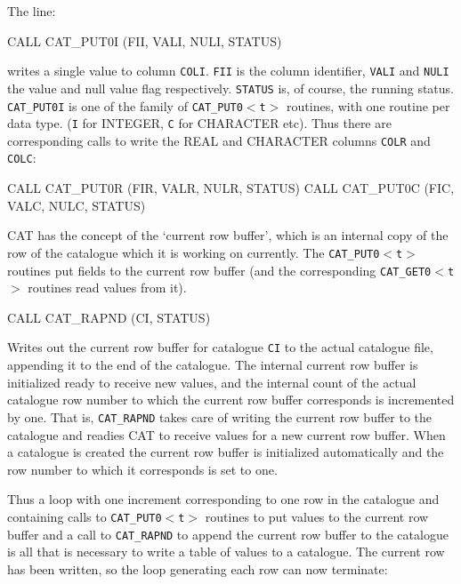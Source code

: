 \documentclass[11pt,twoside]{starlink}
\begin{document}
The line:

\begin{terminalv}
            CALL CAT_PUT0I (FII, VALI, NULI, STATUS)
\end{terminalv}

writes a single value to column \texttt{COLI}. \texttt{FII} is the column
identifier, \texttt{VALI} and \texttt{NULI} the value and null value flag
respectively. \texttt{STATUS} is, of course, the running status. \texttt{CAT\_PUT0I} is one of the family of \texttt{CAT\_PUT0$<$t$>$} routines,
with one routine per data type. (\texttt{I} for INTEGER, \texttt{C} for
CHARACTER etc). Thus there are corresponding calls to write the REAL and
CHARACTER columns \texttt{COLR} and \texttt{COLC}:

\begin{terminalv}
            CALL CAT_PUT0R (FIR, VALR, NULR, STATUS)
            CALL CAT_PUT0C (FIC, VALC, NULC, STATUS)
\end{terminalv}

CAT has the concept of the `current row buffer', which is an internal
copy of the row of the catalogue which it is working on currently. The
\texttt{CAT\_PUT0$<$t$>$} routines put fields to the current row buffer
(and the corresponding \texttt{CAT\_GET0$<$t$>$} routines read values from
it).

\begin{terminalv}
            CALL CAT_RAPND (CI, STATUS)
\end{terminalv}

Writes out the current row buffer for catalogue \texttt{CI} to the actual
catalogue file, appending it to the end of the catalogue. The internal
current row buffer is initialized ready to receive new values, and the
internal count of the actual catalogue row number to which the current
row buffer corresponds is incremented by one. That is, \texttt{CAT\_RAPND}
takes care of writing the current row buffer to the catalogue and
readies CAT to receive values for a new current row buffer. When a
catalogue is created the current row buffer is initialized automatically
and the row number to which it corresponds is set to one.

Thus a loop with one increment corresponding to one row in the
catalogue and containing calls to \texttt{CAT\_PUT0$<$t$>$} routines to put
values to the current row buffer and a call to \texttt{CAT\_RAPND} to
append the current row buffer to the catalogue is all that is necessary
to write a table of values to a catalogue. The current row has been
written, so the loop generating each row can now terminate:
\end{document}
